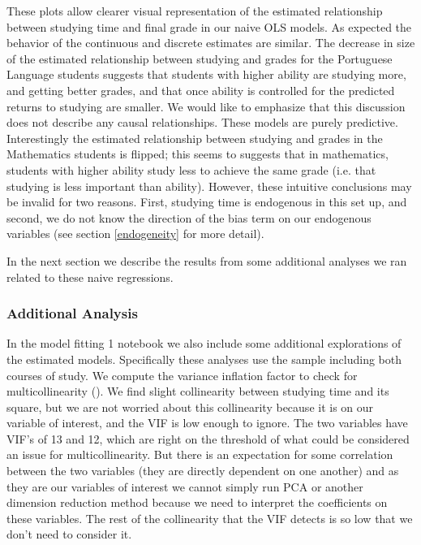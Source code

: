 \documentclass[12pt]{article}
\begin{document}
These plots allow clearer visual representation of the estimated relationship between studying time and final grade in our naive OLS models. As expected the behavior of the continuous and discrete estimates are similar. The decrease in size of the estimated relationship between studying and grades for the Portuguese Language students suggests that students with higher ability are studying more, and getting better grades, and that once ability is controlled for the predicted returns to studying are smaller. We would like to emphasize that this discussion does not describe any causal relationships. These models are purely predictive. Interestingly the estimated relationship between studying and grades in the Mathematics students is flipped; this seems to suggests that in mathematics, students with higher ability study less to achieve the same grade (i.e. that studying is less important than ability). However, these intuitive conclusions may be invalid for two reasons. First, studying time is endogenous in this set up, and second, we do not know the direction of the bias term on our endogenous variables (see section \ref{endogeneity} for more detail).

In the next section we describe the results from some additional analyses we ran related to these naive regressions.

\subsubsection{Additional Analysis}
In the model fitting 1 notebook we also include some additional explorations of the estimated models. Specifically these analyses use the sample including both courses of study. We compute the variance inflation factor to check for multicollinearity (\cite{VIF, detecting}). We find slight collinearity between studying time and its square, but we are not worried about this collinearity because it is on our variable of interest, and the VIF is low enough to ignore. The two variables have VIF's of 13 and 12, which are right on the threshold of what could be considered an issue for multicollinearity. But there is an expectation for some correlation between the two variables (they are directly dependent on one another) and as they are our variables of interest we cannot simply run PCA or another dimension reduction method because we need to interpret the coefficients on these variables. The rest of the collinearity that the VIF detects is so low that we don't need to consider it.
\end{document}
